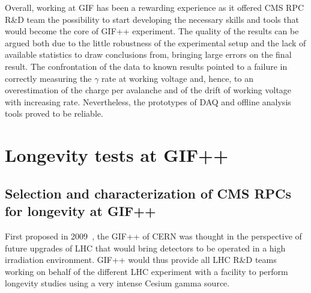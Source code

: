 	Overall, working at GIF has been a rewarding experience as it offered CMS RPC R\&D team the possibility to start developing the necessary skills and tools that would become the core of GIF++ experiment. The quality of the results can be argued both due to the little robustness of the experimental setup and the lack of available statistics to draw conclusions from, bringing large errors on the final result. The confrontation of the data to known results pointed to a failure in correctly measuring the $\gamma$ rate at working voltage and, hence, to an overestimation of the charge per avalanche and of the drift of working voltage with increasing rate. Nevertheless, the prototypes of DAQ and offline analysis tools proved to be reliable.

\section{Longevity tests at \acs{GIF++}}
\label{chapt5:sec:GIFpptests}

	\subsection{Selection and characterization of CMS RPCs for longevity at GIF++}
	\label{chapt5:ssec:selection}

	First proposed in 2009~\cite{GIF++2009}, the \acl{GIF++} of CERN was thought in the perspective of future upgrades of LHC that would bring detectors to be operated in a high irradiation environment. GIF++ would thus provide all LHC R\&D teams working on behalf of the different LHC experiment with a facility to perform longevity studies using a very intense Cesium gamma source.
	
